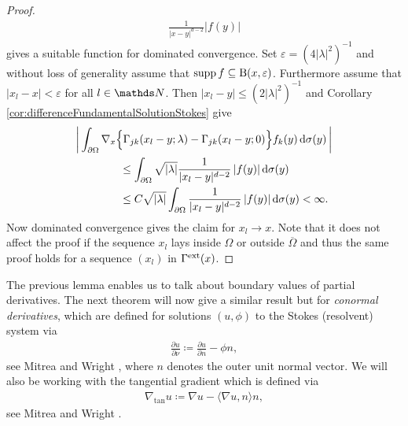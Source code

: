 \begin{proof}
\begin{align*}
    \frac{1}{|x -y|^{d - 2}} |f(y)|
  \end{align*}
  gives a suitable function for dominated convergence.
  Set $\varepsilon = (4 |\lambda|^2)^{-1}$ and without loss of generality assume that $\operatorname{supp} f \subseteq \mathrm{B}(x,\varepsilon)$.
  Furthermore assume that $|x_l - x| < \varepsilon$ for all $l \in \N$.
  Then $|x_l - y| \leq (2|\lambda|^2)^{-1}$ and Corollary \ref{cor:differenceFundamentalSolutionStokes} give
  \begin{align*}
    &\bigg| \int_{\partial\Omega} \nabla_x \Big\{ \Gamma_{jk}(x_l - y; \lambda) - \Gamma_{jk}(x_l - y; 0)\Big\} f_k(y) \, {\operatorname{d}\!{\sigma}}(y)\, \bigg| \\
    &\qquad\qquad\leq \int_{\partial\Omega} \sqrt{|\lambda|} \frac{1}{|x_l - y|^{d - 2}}\, |f(y)| \, {\operatorname{d}\!{\sigma}}(y) \\
    &\qquad\qquad\leq {C} \sqrt{|\lambda|} \int_{\partial\Omega} \frac{1}{|x_l - y|^{d - 2}}\, |f(y)| \, {\operatorname{d}\!{\sigma}}(y) < \infty.
  \end{align*}
  Now dominated convergence gives the claim for $x_l \to x$.
  Note that it does not affect the proof if the sequence $x_l$ lays inside $\Omega$ or outside $\overline\Omega$ and thus the same proof holds for a sequence $(x_l)$ in $\Gamma^{\mathrm{ext}}(x)$.
\end{proof}

The previous lemma enables us to talk about boundary values of partial derivatives. 
The next theorem will now give a similar result but for \emph{conormal derivatives}, which are defined for solutions $(u,\phi)$ to the Stokes (resolvent) system via 
\begin{align}
  \label{eq:conormalDerivative}
  \frac{\partial u}{\partial \nu} \coloneqq \frac{\partial u}{\partial n} - \phi n,
\end{align}
see Mitrea and Wright \cite[Eq. (1.2)]{mitreaWright}, where $n$ denotes the outer unit normal vector.
We will also be working with the tangential gradient which is defined via
\begin{align}
  \label{eq:tangentialGradient}
  \nabla_{\mathrm{tan}} u \coloneqq \nabla u - \langle \nabla u, n \rangle n,
\end{align}
see Mitrea and Wright \cite[p. 17]{mitreaWright}.

